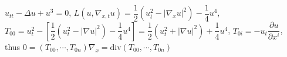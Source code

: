 \documentclass[main]{subfiles}
\begin{document}
\begin{example}
$u_{tt}-\Delta u+u^3=0$, $L(u,\nabla_{x,t} u)=\dfrac{1}{2}(u_t^2-|\nabla_xu|^2)-\dfrac{1}{4}u^4$, $T_{00}=u_t^2-\left[\dfrac{1}{2}(u_t^2-|\nabla u|^2)-\dfrac{1}{4}u^4\right]=\dfrac{1}{2}(u_t^2+|\nabla u|^2)+\dfrac{1}{4}u^4$, $T_{0i}=-u_t\dfrac{\partial u}{\partial x^i}$, thus $0=(T_{00},\cdots,T_{0n})\nabla_x=\mathrm{div}(T_{00},\cdots,T_{0n})$
\end{example}
\end{document}
